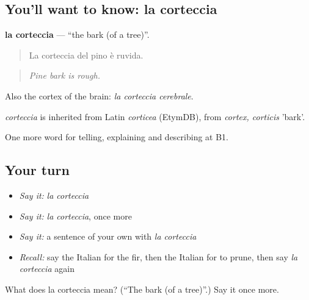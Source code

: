 \subsection*{You'll want to know: la corteccia}
\textbf{la corteccia} — \textquotedblleft{}the bark (of a tree)\textquotedblright{}.

\begin{quote}
La corteccia del pino è ruvida.
\end{quote}

\begin{quote}
\emph{Pine bark is rough.}
\end{quote}

Also the cortex of the brain: \emph{la corteccia cerebrale}.

\begin{cousinweb}
\emph{corteccia} is inherited from Latin \emph{corticea} (EtymDB), from \emph{cortex, corticis} 'bark'.
\end{cousinweb}

\begin{grammarlens}[title={What you've built}]
One more word for telling, explaining and describing at B1.
\end{grammarlens}

\subsection*{Your turn}
\begin{itemize}
\raggedright
  \item \emph{Say it:} \emph{la corteccia}
  \item \emph{Say it:} \emph{la corteccia}, once more
  \item \emph{Say it:} a sentence of your own with \emph{la corteccia}
  \item \emph{Recall:} say the Italian for the fir, then the Italian for to prune, then say \emph{la corteccia} again
\end{itemize}

\begin{tcolorbox}[breakable,colback=teal!4,colframe=teal!35!black,title={Before you move on}]
What does la corteccia mean? (\textquotedblleft{}The bark (of a tree)\textquotedblright{}.) Say it once more.
\end{tcolorbox}
